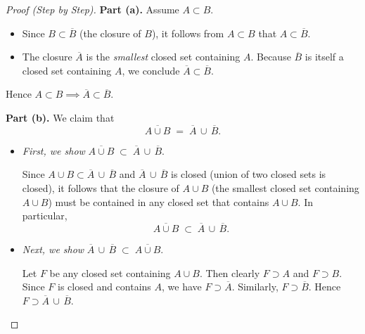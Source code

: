 \documentclass[12pt]{article}
\theoremstyle{definition} %
\theoremstyle{plain} %
\begin{document}
                    \begin{proof}[Proof (Step by Step)]
                    \textbf{Part (a).} Assume $A \subset B$.  
                    
                    \begin{itemize}
                    \item Since $B \subset \overline{B}$ (the closure of $B$), it follows from $A \subset B$ that $A \subset \overline{B}$.  
                    \item The closure $\overline{A}$ is the \emph{smallest} closed set containing $A$.  Because $\overline{B}$ is itself a closed set containing $A$, we conclude $\overline{A} \subset \overline{B}$.  
                    \end{itemize}
                    
                    Hence $A \subset B \implies \overline{A} \subset \overline{B}$.
                    
                    \medskip
                    
                    \textbf{Part (b).} We claim that
                    \[
                    \overline{A \cup B} \;=\; \overline{A}\,\cup\,\overline{B}.
                    \]
                    
                    \begin{itemize}
                    \item \emph{First, we show} $\overline{A \cup B} \;\subset\; \overline{A}\,\cup\,\overline{B}$.  
                    
                    Since $A \cup B \subset \overline{A}\,\cup\,\overline{B}$ and $\overline{A}\,\cup\,\overline{B}$ is closed (union of two closed sets is closed), it follows that the closure of $A \cup B$ (the smallest closed set containing $A \cup B$) must be contained in any closed set that contains $A \cup B$.  In particular,
                    \[
                    \overline{A \cup B} \;\subset\; \overline{A}\,\cup\,\overline{B}.
                    \]
                    
                    \item \emph{Next, we show} $\overline{A}\,\cup\,\overline{B} \;\subset\; \overline{A \cup B}$.  
                    
                    Let $F$ be any closed set containing $A \cup B$.  Then clearly $F \supset A$ and $F \supset B$.  
                    Since $F$ is closed and contains $A$, we have $F \supset \overline{A}$.  Similarly, $F \supset \overline{B}$.  
                    Hence $F \supset \overline{A}\,\cup\,\overline{B}$.  
                    

\end{itemize}
\end{proof}
\end{document}
